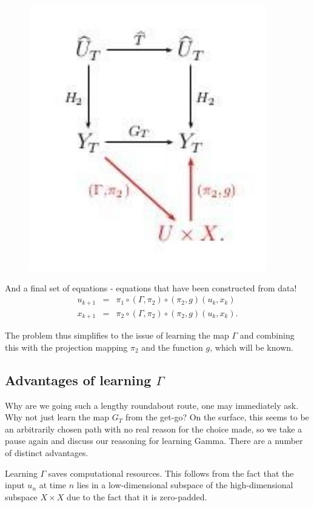 \documentclass[12 pt]{article}
\begin{document}
\begin{figure}[ht]
  \includegraphics[scale=0.3]{gammatemp.png}
  \centering
  \label{fig:conjugacy_with_Gamma}
\end{figure}

And a final set of equations - equations that have been constructed from data!
\begin{eqnarray}
	u_{k+1} &=& \pi_1 \circ (\Gamma, \pi_2) \circ (\pi_2,g) (u_k,x_k) \label{Seqn_u}\\
	x_{k+1} &=& \pi_2 \circ (\Gamma, \pi_2) \circ (\pi_2,g) (u_k,x_k). \label{Seqn_x}
\end{eqnarray}

The problem thus simplifies to the issue of learning the map $\Gamma$ and combining this with the projection mapping $\pi_2$ and the function $g$, which will be known.

\subsection{Advantages of learning $\Gamma$}

Why are we going such a lengthy roundabout route, one may immediately ask. Why not just learn the map $G_T$ from the get-go? On the surface, this seems to be an arbitrarily chosen path with no real reason for the choice made, so we take a pause again and discuss our reasoning for learning Gamma.
There are a number of distinct advantages. 

Learning $\Gamma$ saves computational resources. This follows from the fact that the input $u_n$ at time $n$ lies in a low-dimensional subspace of the high-dimensional subspace $X\times{X}$ due to the fact that it is zero-padded. 
\end{document}

